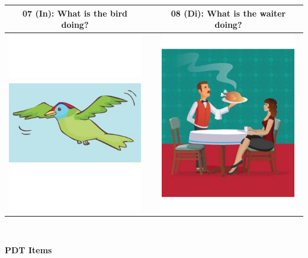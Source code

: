 \documentclass[12pt,notitlepage]{article}
\begin{document}
\begin{center}
\begin{tabular}{|c|c|c|}
\hline
07 (In): What is the bird doing? && 08 (Di): What is the waiter doing? \\
\hline
\includegraphics[width=16em,trim=0 0 0 -3]{figures/I07.jpg} & & \includegraphics[width=16em,trim=0 0 0 -3]{figures/I08.jpg} \\
\hline
\end{tabular}
\vspace{1em} \\


\clearpage

{\Large \textbf{PDT Items}}

\vspace{2em}


\end{center}
\end{document}
